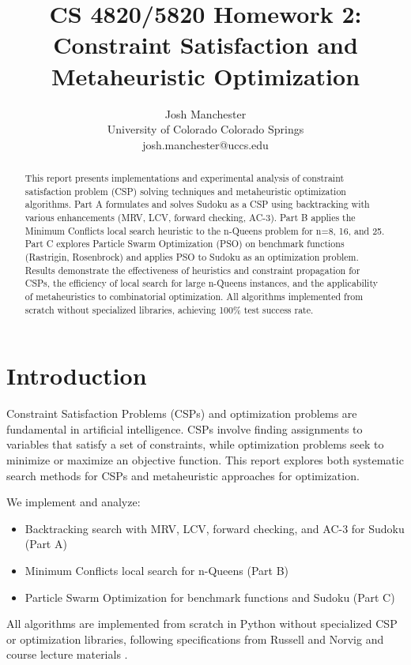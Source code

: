 \documentclass[letterpaper]{article}
\title{CS 4820/5820 Homework 2:\\
Constraint Satisfaction and Metaheuristic Optimization}
\author{
Josh Manchester\\
University of Colorado Colorado Springs\\
josh.manchester@uccs.edu
}
\begin{document}
\maketitle

\begin{abstract}
This report presents implementations and experimental analysis of constraint satisfaction problem (CSP) solving techniques and metaheuristic optimization algorithms. Part A formulates and solves Sudoku as a CSP using backtracking with various enhancements (MRV, LCV, forward checking, AC-3). Part B applies the Minimum Conflicts local search heuristic to the n-Queens problem for n=8, 16, and 25. Part C explores Particle Swarm Optimization (PSO) on benchmark functions (Rastrigin, Rosenbrock) and applies PSO to Sudoku as an optimization problem. Results demonstrate the effectiveness of heuristics and constraint propagation for CSPs, the efficiency of local search for large n-Queens instances, and the applicability of metaheuristics to combinatorial optimization. All algorithms implemented from scratch without specialized libraries, achieving 100\% test success rate.
\end{abstract}

\section{Introduction}

Constraint Satisfaction Problems (CSPs) and optimization problems are fundamental in artificial intelligence. CSPs involve finding assignments to variables that satisfy a set of constraints, while optimization problems seek to minimize or maximize an objective function. This report explores both systematic search methods for CSPs and metaheuristic approaches for optimization.

We implement and analyze:
\begin{itemize}
\item Backtracking search with MRV, LCV, forward checking, and AC-3 for Sudoku (Part A)
\item Minimum Conflicts local search for n-Queens (Part B)
\item Particle Swarm Optimization for benchmark functions and Sudoku (Part C)
\end{itemize}

All algorithms are implemented from scratch in Python without specialized CSP or optimization libraries, following specifications from Russell and Norvig \cite{russell2020} and course lecture materials \cite{atyabi2025csp,atyabi2025optimization}.
\end{document}
